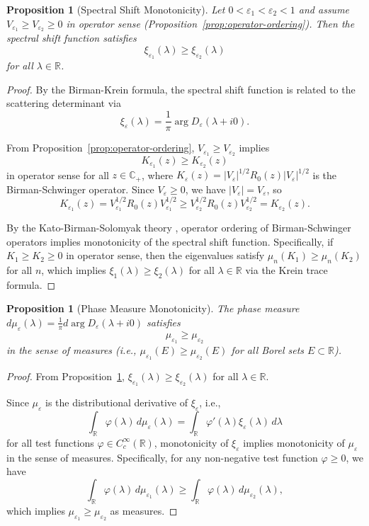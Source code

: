 ﻿\documentclass[12pt,a4paper]{article}
\newtheorem{proposition}[theorem]{Proposition}
\theoremstyle{definition}
\theoremstyle{remark}
\newcommand{\CC}{\mathbb{C}}
\newcommand{\RR}{\mathbb{R}}
\begin{document}
\begin{proposition}[Spectral Shift Monotonicity]
\label{prop:spectral-shift-monotone}
Let $0 < \varepsilon_1 < \varepsilon_2 < 1$ and assume $V_{\varepsilon_1} \geq V_{\varepsilon_2} \geq 0$ in operator sense (Proposition~\ref{prop:operator-ordering}). Then the spectral shift function satisfies
\[
\xi_{\varepsilon_1}(\lambda) \geq \xi_{\varepsilon_2}(\lambda)
\]
for all $\lambda \in \RR$.
\end{proposition}

\begin{proof}
By the Birman-Krein formula, the spectral shift function is related to the scattering determinant via
\[
\xi_\varepsilon(\lambda) = \frac{1}{\pi} \arg D_\varepsilon(\lambda + i0).
\]

From Proposition~\ref{prop:operator-ordering}, $V_{\varepsilon_1} \geq V_{\varepsilon_2}$ implies
\[
K_{\varepsilon_1}(z) \geq K_{\varepsilon_2}(z)
\]
in operator sense for all $z \in \CC_+$, where $K_\varepsilon(z) = |V_\varepsilon|^{1/2} R_0(z) |V_\varepsilon|^{1/2}$ is the Birman-Schwinger operator. Since $V_\varepsilon \geq 0$, we have $|V_\varepsilon| = V_\varepsilon$, so
\[
K_{\varepsilon_1}(z) = V_{\varepsilon_1}^{1/2} R_0(z) V_{\varepsilon_1}^{1/2} \geq V_{\varepsilon_2}^{1/2} R_0(z) V_{\varepsilon_2}^{1/2} = K_{\varepsilon_2}(z).
\]

By the Kato-Birman-Solomyak theory \cite{Birman1975}, operator ordering of Birman-Schwinger operators implies monotonicity of the spectral shift function. Specifically, if $K_1 \geq K_2 \geq 0$ in operator sense, then the eigenvalues satisfy $\mu_n(K_1) \geq \mu_n(K_2)$ for all $n$, which implies $\xi_1(\lambda) \geq \xi_2(\lambda)$ for all $\lambda \in \RR$ via the Krein trace formula.
\end{proof}

\begin{proposition}[Phase Measure Monotonicity]
\label{prop:phase-measure-monotone}
The phase measure $d\mu_\varepsilon(\lambda) = \frac{1}{\pi} d\arg D_\varepsilon(\lambda + i0)$ satisfies
\[
\mu_{\varepsilon_1} \geq \mu_{\varepsilon_2}
\]
in the sense of measures (i.e., $\mu_{\varepsilon_1}(E) \geq \mu_{\varepsilon_2}(E)$ for all Borel sets $E \subset \RR$).
\end{proposition}

\begin{proof}
From Proposition~\ref{prop:spectral-shift-monotone}, $\xi_{\varepsilon_1}(\lambda) \geq \xi_{\varepsilon_2}(\lambda)$ for all $\lambda \in \RR$.

Since $\mu_\varepsilon$ is the distributional derivative of $\xi_\varepsilon$, i.e.,
\[
\int_\RR \varphi(\lambda) \, d\mu_\varepsilon(\lambda) = \int_\RR \varphi'(\lambda) \xi_\varepsilon(\lambda) \, d\lambda
\]
for all test functions $\varphi \in C_c^\infty(\RR)$, monotonicity of $\xi_\varepsilon$ implies monotonicity of $\mu_\varepsilon$ in the sense of measures. Specifically, for any non-negative test function $\varphi \geq 0$, we have
\[
\int_\RR \varphi(\lambda) \, d\mu_{\varepsilon_1}(\lambda) \geq \int_\RR \varphi(\lambda) \, d\mu_{\varepsilon_2}(\lambda),
\]
which implies $\mu_{\varepsilon_1} \geq \mu_{\varepsilon_2}$ as measures.
\end{proof}
\end{document}
